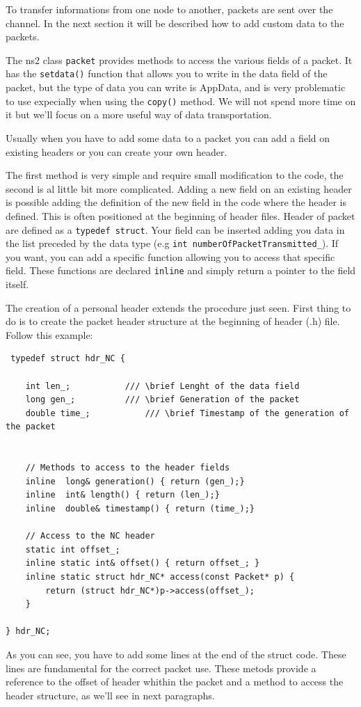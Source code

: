 \documentclass[a4paper,10pt]{article}
\begin{document}
To transfer informations from one node to another, packets are sent over the channel. In the next section it will be described how to add custom data to the packets.

The ns2 class \verb=packet= provides methods to access the various fields of a packet. It has the \verb=setdata()= function that allows you to write in the data field of the packet, but the type of data you can write is AppData, and is very problematic to use expecially when using the \verb=copy()= method. We will not spend more time on it but we'll focus on a more useful way of data transportation.

Usually when you have to add some data to a packet you can add a field on existing headers or you can create your own header.

The first method is very simple and require small modification to the code, the second is al little bit more complicated.
Adding a new field on an existing header is possible adding the definition of the new field in the code where the header is defined. This is often positioned at the beginning of header files. Header of packet are defined as a \verb=typedef struct=. Your field can be inserted adding you data in the list preceded by the data type (e.g \verb=int numberOfPacketTransmitted_=). If you want, you can add a specific function allowing you to access that specific field. These functions are declared \verb=inline= and simply return a pointer to the field itself.

The creation of a personal header extends the procedure just seen. First thing to do is to create the packet header structure at the beginning of header (.h) file. Follow this example:

\begin{verbatim}
 typedef struct hdr_NC {
	 
	int len_;			/// \brief Lenght of the data field
	long gen_; 			/// \brief Generation of the packet
	double time_;			/// \brief Timestamp of the generation of the packet


	// Methods to access to the header fields
	inline	long& generation() { return (gen_);}
	inline	int& length() { return (len_);}
	inline	double& timestamp() { return (time_);}

	// Access to the NC header
	static int offset_;
	inline static int& offset() { return offset_; }
	inline static struct hdr_NC* access(const Packet* p) {
		return (struct hdr_NC*)p->access(offset_);
	}

} hdr_NC;
\end{verbatim}
As you can see, you have to add some lines at the end of the struct code. These lines are fundamental for the correct packet use. These metods provide a reference to the offset of header whithin the packet and a method to access the header structure, as we'll see in next paragraphs.
\end{document}
